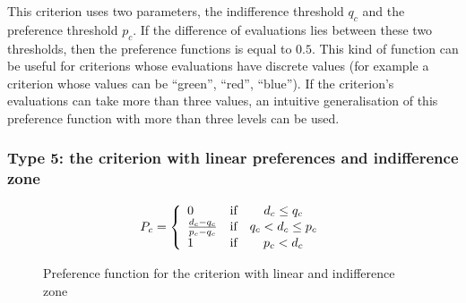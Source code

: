 This criterion uses two parameters, the indifference threshold $q_c$ and the preference threshold $p_c$. If the difference of evaluations lies between these two thresholds, then the preference functions is equal to $0.5$.
This kind of function can be useful for criterions whose evaluations have discrete values (for example a criterion whose values can be ``green'', ``red'', ``blue'').
If the criterion's evaluations can take more than three values, an intuitive generalisation of this preference function with more than three levels can be used.

\subsubsection{Type 5: the criterion with linear preferences and indifference zone} \label{ss:pref_type_5}
\begin{figure}[H]
\begin{minipage}{.4\textwidth}
    \begin{center}
    \end{center}
\end{minipage}%
\begin{minipage}{.6\textwidth}
    \begin{equation}
        P_c = \left\{
            \begin{array}{l l c}
                0                       & \text{if}  & d_{c} \le q_c \\
                \frac{d_c-q_c}{p_c-q_c} & \text{if}  & q_c < d_c  \le p_c \\
                1                       & \text{if}  & p_c < d_c \\
            \end{array}
            \right .
            \label{eq:type5_criterion}
    \end{equation}
\end{minipage}
\caption{ Preference function for the criterion with linear and indifference zone}
\end{figure}


